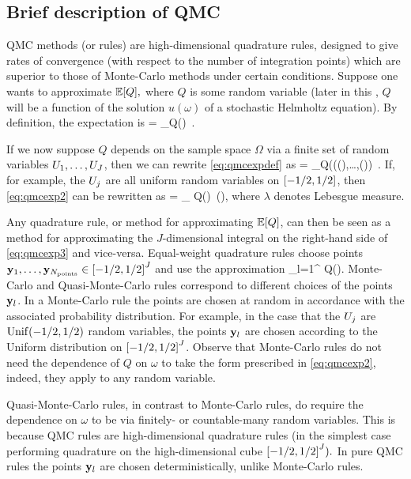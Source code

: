 \subsection{Brief description of QMC}

QMC methods (or rules) are high-dimensional quadrature rules, designed to give rates of convergence (with respect to the number of integration points) which are superior to those of Monte-Carlo methods under certain conditions. Suppose one wants to approximate $\EXP{Q},$ where $Q$ is some random variable (later in this , $Q$ will be a function of the solution $u(\omega)$ of a stochastic Helmholtz equation). By definition, the expectation is
\beq\label{eq:qmcexpdef}
 = \int_\Omega Q(\omega)\ \ddPPomega.
\eeq

If we now suppose $Q$ depends on the sample space $\Omega$ via a finite set of random variables $U_{1},\ldots,U_{J}$, then we can rewrite \cref{eq:qmcexpdef} as
\beq\label{eq:qmcexp2}
 = \int_\Omega Q\mleft((\Uo(\omega),\ldots,\UJ(\omega)\mright)\, \ddPPomega.
\eeq
If, for example, the $U_{j}$ are all uniform random variables on $\mleft[-1/2,1/2\mright]$, then \cref{eq:qmcexp2} can be rewritten as
\beq\label{eq:qmcexp3}
 = \int_{} Q\mleft(\by\mright)\, \dd\lambda(\by),
\eeq
where $\lambda$ denotes Lebesgue measure.

Any quadrature rule, or method for approximating $\EXP{Q}$, can then be seen as a method for approximating the $J$-dimensional integral on the right-hand side of \cref{eq:qmcexp3} and vice-versa. Equal-weight quadrature rules choose points $\byo,\ldots,\byNpoints \in \cube{J}$ and use the approximation
\beqs
{} \approx {}\sum_{l=1}^{\Npoints} Q\mleft(\byl\mright).
\eeqs
Monte-Carlo and Quasi-Monte-Carlo rules correspond to different choices of the points $\mathbf{y}_{l}$. In a Monte-Carlo rule the points are chosen at random in accordance with the associated probability distribution. For example, in the case that the $U_{j}$ are $\mathrm{Unif}(-1/2,1/2)$ random variables, the points $\mathbf{y}_{l}$ are chosen according to the Uniform distribution on $\cube{J}$. Observe that Monte-Carlo rules do not need the dependence of $Q$ on $\omega$ to take the form prescribed in \cref{eq:qmcexp2}, indeed, they apply to any random variable.

Quasi-Monte-Carlo rules, in contrast to Monte-Carlo rules, do require the dependence on $\omega$ to be via finitely- or countable-many random variables. This is because QMC rules are high-dimensional quadrature rules (in the simplest case performing quadrature on the high-dimensional cube $\cube{J}).$ In pure QMC rules the points $\mathbf{y}_{l}$ are chosen deterministically, unlike Monte-Carlo rules.

